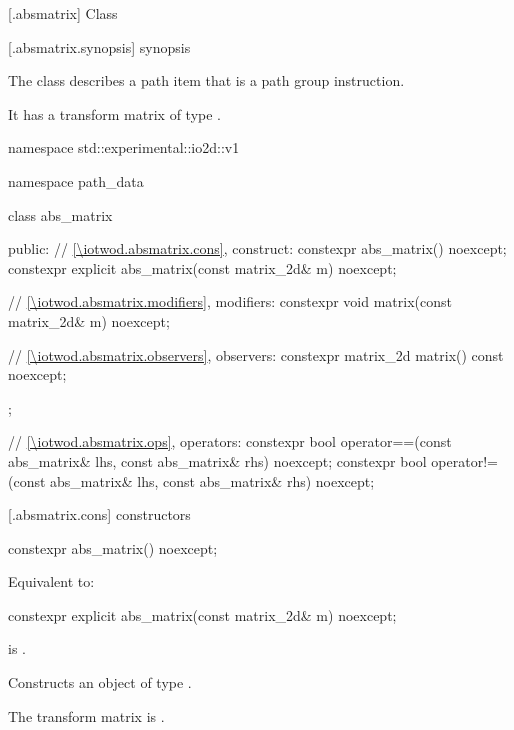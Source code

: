  [\iotwod.absmatrix] {Class }%

 [\iotwod.absmatrix.synopsis] { synopsis}%

\pnum
{}%
The class  describes a path item that is a path group instruction.

\pnum
It has a transform matrix of type .

\begin{codeblock}
namespace std::experimental::io2d::v1 {
  namespace path_data {
    class abs_matrix {
    public:
      // \ref{\iotwod.absmatrix.cons}, construct:
      constexpr abs_matrix() noexcept;
      constexpr explicit abs_matrix(const matrix_2d& m) noexcept;

      // \ref{\iotwod.absmatrix.modifiers}, modifiers:
      constexpr void matrix(const matrix_2d& m) noexcept;

      // \ref{\iotwod.absmatrix.observers}, observers:
      constexpr matrix_2d matrix() const noexcept;
    };
    
    // \ref{\iotwod.absmatrix.ops}, operators:
    constexpr bool operator==(const abs_matrix& lhs, const abs_matrix& rhs) 
      noexcept;
    constexpr bool operator!=(const abs_matrix& lhs, const abs_matrix& rhs) 
      noexcept;
  }
}
\end{codeblock}

 [\iotwod.absmatrix.cons] { constructors}

%
\begin{itemdecl}
constexpr abs_matrix() noexcept;
\end{itemdecl}
\begin{itemdescr}
\pnum
\effects
Equivalent to: 
\end{itemdescr}

%
\begin{itemdecl}
constexpr explicit abs_matrix(const matrix_2d& m) noexcept;
\end{itemdecl}
\begin{itemdescr}
\pnum
\requires
{} is .

\pnum
\effects
Constructs an object of type .

\pnum
The transform matrix is .
\end{itemdescr}

